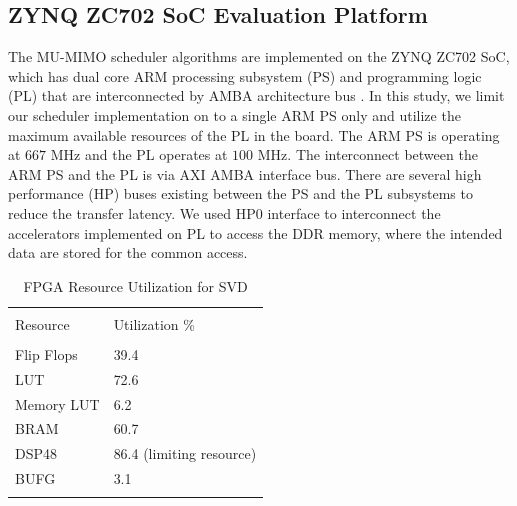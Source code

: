\documentclass[conference,letterpaper,10pt]{./../../IEEE/IEEEtran}
\begin{document}
\subsection{ZYNQ ZC702 SoC Evaluation Platform}
The \ac{MU-MIMO} scheduler algorithms are implemented on the ZYNQ ZC702 SoC, which has dual core ARM processing subsystem (PS) and programming logic (PL) that are interconnected by \ac{AMBA} architecture bus \cite{zynq}. In this study, we limit our scheduler implementation on to a single ARM PS only and utilize the maximum available resources of the PL in the board. The ARM PS is operating at $667$ MHz and the PL operates at $100$ MHz. The interconnect between the ARM PS and the PL is via \ac{AXI} \ac{AMBA} interface bus. There are several high performance (HP) buses existing between the PS and the PL subsystems to reduce the transfer latency. We used HP$0$ interface to interconnect the accelerators implemented on PL to access the DDR memory, where the intended data are stored for the common access.
\begin{table} \caption{FPGA Resource Utilization for SVD} \begin{center} \small \begin{tabular}{l l} \hline \\
Resource 	&  	Utilization \% \\ 
\hline \\
Flip Flops 	& 	39.4 \\
LUT 		& 	72.6 \\
Memory LUT 	& 	6.2 \\
BRAM 		& 	60.7 \\
DSP48 		& 	86.4 (limiting resource)\\
BUFG 		& 	3.1 \\ 
\hline \vspace{-0.25in}
\end{tabular} \label{tbl-utilization} \end{center} \end{table}
\end{document}

